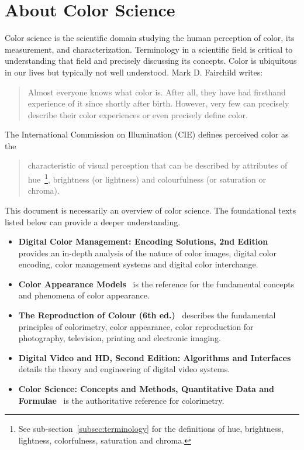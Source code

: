 \section{About Color Science}
\label{sec:about-color-science}

Color science is the scientific domain studying the human perception of color,
its measurement, and characterization. Terminology in a scientific field is
critical to understanding that field and precisely discussing its concepts.
Color is ubiquitous in our lives but typically not well understood.
\ccpar
Mark D. Fairchild writes:~\blockquote{Almost everyone knows what color is.
After all, they have had firsthand experience of it since shortly after birth.
However, very few can precisely describe their color experiences or even
precisely define color.}
\ccpar
The International Commission on Illumination (CIE) defines perceived color as
the~\blockcquote{CIEbk}{characteristic of visual perception that can be
described by attributes of hue~\footnote{See sub-section~\ref{subsec:terminology}
for the definitions of hue, brightness, lightness, colorfulness, saturation and
chroma.}, brightness (or lightness) and colourfulness (or saturation or
chroma).}
\ccpar
This document is necessarily an overview of color science. The foundational
texts listed below can provide a deeper understanding.
\begin{itemize}
    \item \textbf{Digital Color Management: Encoding Solutions, 2nd Edition}~\parencite{Madden2007}
provides an in-depth analysis of the nature of color images, digital color
encoding, color management systems and digital color interchange.
    \item \textbf{Color Appearance Models}~\parencite{Fairchild2013u} is the
reference for the fundamental concepts and phenomena of color appearance.
    \item \textbf{The Reproduction of Colour (6th ed.)}~\parencite{Hunt2004b}
describes the fundamental principles of colorimetry, color appearance, color
reproduction for photography, television, printing and electronic imaging.
    \item \textbf{Digital Video and HD, Second Edition: Algorithms and Interfaces}~\parencite{Poynton2012}
details the theory and engineering of digital video systems.
    \item \textbf{Color Science: Concepts and Methods, Quantitative Data and Formulae}~\parencite{Wyszecki2000bi}
is the authoritative reference for colorimetry.
\end{itemize}


